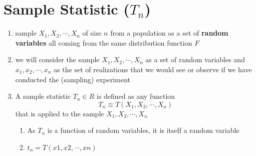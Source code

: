 \section{Sample Statistic ($T_n$) \cite{ism-1}}\label{Sample Statistic}

\begin{enumerate}
    \item sample $X_1, X_2, \cdots, X_n$ of size $n$ from a population as a set of \textbf{random variables} all coming from the same distribution function $F$

    \item we will consider the sample $X_1, X_2, \cdots, X_n$ as a set of random variables and $x_1, x_2,\cdots, x_n$ as the set of realizations that we would see or observe if we have conducted the (sampling) experiment

    \item A sample statistic $T_n \in R$ is defined as any function 
    \[
        T_n \equiv T(X_1, X_2,\cdots, X_n)
    \]
    that is applied to the sample $X_1, X_2,\cdots, X_n$
    \begin{enumerate}
        \item As $T_n$ is a function of random variables, it is itself a random variable
        
        \item $t_n = T(x1, x2,\cdots, xn)$
    \end{enumerate}

\end{enumerate}


